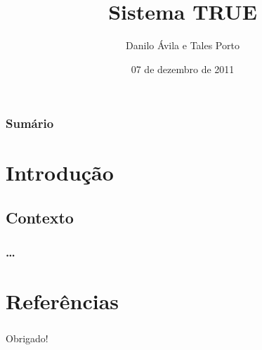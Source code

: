 \documentclass{beamer}
\title{Sistema TRUE}
\author{Danilo Ávila e Tales Porto}
\institute[UnB]
{
    Departamento de Ciência da Computação\\
    Instituto de Ciências Exatas\\
    Universidade de Brasília
}
\date{07 de dezembro de 2011}
\begin{document}
\begin{frame}
\titlepage
\end{frame}


\begin{frame}
	\frametitle{Sumário}
	\tableofcontents
\end{frame}


\section{Introdução}

\subsection{Contexto}

\begin{frame}
    \frametitle{\ldots}
\end{frame}











\nocite{fabriciobuzzeto,weiser2,saocarlos,yang,hewitt,violajones}

\section{Referências}


\begin{frame}
    \frametitle{ }
    \centerline{Obrigado!}
\end{frame}
\end{document}
